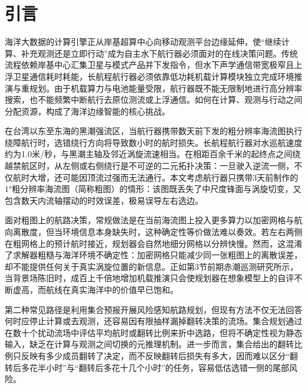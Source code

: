 \section{引言}

海洋大数据的计算引擎正从岸基超算中心向移动观测平台边缘延伸，使“继续计算、补充观测还是立即行动”成为自主水下航行器必须面对的在线决策问题。传统流程依赖岸基中心汇集卫星与模式产品并下发指令\cite{chassignet2007hycom,chin2017mur}，但水下声学通信带宽极窄且上浮卫星通信耗时耗能，长航程航行器必须依靠低功耗机载计算模块独立完成环境推演与重规划\cite{remus100,jetsonorinnx}。由于机载算力与电池能量受限，航行器既不能无限制地进行高分辨率搜索，也不能频繁中断航行去原位测流或上浮通信\cite{horvitz1987reasoning,russell1991right}。如何在计算、观测与行动之间分配资源，构成了海洋边缘智能的核心挑战\cite{sung2021quit,magnino2026metareasoning}。

在台湾以东至东海的黑潮强流区，当航行器携带数天前下发的粗分辨率海流图执行绕障航行时，选错绕行方向将导致数小时的航时损失。长航程航行器对水巡航速度约为1.0米/秒，与黑潮主轴及邻近涡旋流速相当。在相距百余千米的起终点之间绕越禁航区时，从左侧或右侧绕行是不可逆的二元拓扑决策：一旦驶入逆流一侧，不仅航时大增，还可能因顶流过强而无法通行。本文考虑航行器只携带3天前制作的1°粗分辨率海流图（简称粗图）的情形：该图既丢失了中尺度锋面与涡旋切变，又包含数天内流轴摆动的时效误差，极易误导左右选边。

面对粗图上的航路决策，常规做法是在当前海流图上投入更多算力以加密网格与航向离散度\cite{lolla2014levelset}，但当环境信息本身缺失时，这种确定性等价做法难以奏效。若左右两侧在粗网格上的预计航时接近，规划器会自然地细分网格以分辨快慢。然而，这混淆了求解器粗糙与海洋环境不确定性：加密网格只能减少同一张粗图上的离散误差，却不能提供任何关于真实涡旋位置的新信息\cite{jiang2015horizon,cuadron2025overthinking}。正如第3节前期赤潮巡测研究所示，当背景场陈旧时，成百上千倍地增加机载推演只会使规划器在想象模型上的自评不断虚高，而航线在真实海洋中的价值早已饱和\cite{smith2006curse}。

第二种常见路径是利用集合预报开展风险感知航路规划，但现有方法不仅无法回答何时应停止计算或去观测，还容易因有限抽样漏掉翻转决策的流场\cite{wang2016path,subramani2018stochastic,kularatne2018forecast}。集合规划通过在数十个扰动流场中评估平均航时或翻转比例来折中选路，但将不确定性视为静态输入，缺乏在计算与观测之间切换的元推理机制\cite{lin2015metareasoning,elboher2023formal}。进一步而言，集合给出的翻转比例只反映有多少成员翻转了决定，而不反映翻转后损失有多大，因而难以区分“翻转后多花半小时”与“翻转后多花十几个小时”的任务，容易低估选错一侧的尾部风险\cite{benhaim2006infogap,marx2020predictive}。

